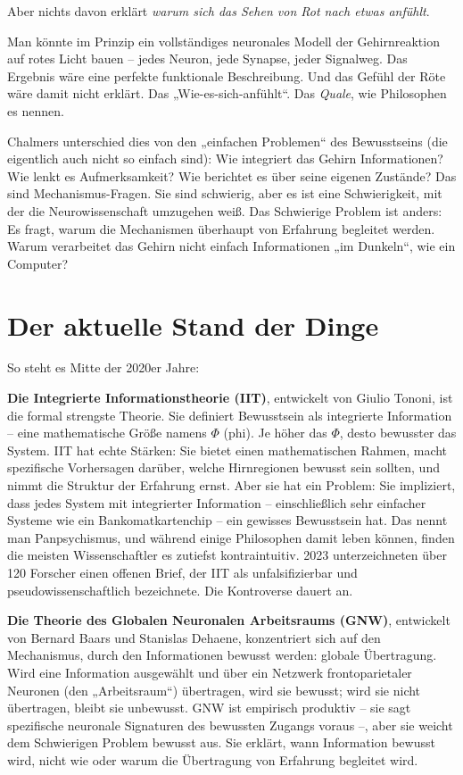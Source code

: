 \documentclass[11pt, twoside, openright]{book}
\begin{document}
Aber nichts davon erklärt \textit{warum sich das Sehen von Rot nach etwas anfühlt}.

Man könnte im Prinzip ein vollständiges neuronales Modell der Gehirnreaktion auf rotes Licht bauen -- jedes Neuron, jede Synapse, jeder Signalweg. Das Ergebnis wäre eine perfekte funktionale Beschreibung. Und das Gefühl der Röte wäre damit nicht erklärt. Das „Wie-es-sich-anfühlt“. Das \textit{Quale}, wie Philosophen es nennen.

Chalmers unterschied dies von den „einfachen Problemen“ des Bewusstseins (die eigentlich auch nicht so einfach sind): Wie integriert das Gehirn Informationen? Wie lenkt es Aufmerksamkeit? Wie berichtet es über seine eigenen Zustände? Das sind Mechanismus-Fragen. Sie sind schwierig, aber es ist eine Schwierigkeit, mit der die Neurowissenschaft umzugehen weiß. Das Schwierige Problem ist anders: Es fragt, warum die Mechanismen überhaupt von Erfahrung begleitet werden. Warum verarbeitet das Gehirn nicht einfach Informationen „im Dunkeln“, wie ein Computer?

\section*{Der aktuelle Stand der Dinge}

So steht es Mitte der 2020er Jahre:

\textbf{Die Integrierte Informationstheorie (IIT)}, entwickelt von Giulio Tononi, ist die formal strengste Theorie. Sie definiert Bewusstsein als integrierte Information -- eine mathematische Größe namens $\Phi$ (phi). Je höher das $\Phi$, desto bewusster das System. IIT hat echte Stärken: Sie bietet einen mathematischen Rahmen, macht spezifische Vorhersagen darüber, welche Hirnregionen bewusst sein sollten, und nimmt die Struktur der Erfahrung ernst. Aber sie hat ein Problem: Sie impliziert, dass jedes System mit integrierter Information -- einschließlich sehr einfacher Systeme wie ein Bankomatkartenchip -- ein gewisses Bewusstsein hat. Das nennt man Panpsychismus, und während einige Philosophen damit leben können, finden die meisten Wissenschaftler es zutiefst kontraintuitiv. 2023 unterzeichneten über 120 Forscher einen offenen Brief, der IIT als unfalsifizierbar und pseudowissenschaftlich bezeichnete. Die Kontroverse dauert an.

\textbf{Die Theorie des Globalen Neuronalen Arbeitsraums (GNW)}, entwickelt von Bernard Baars und Stanislas Dehaene, konzentriert sich auf den Mechanismus, durch den Informationen bewusst werden: globale Übertragung. Wird eine Information ausgewählt und über ein Netzwerk frontoparietaler Neuronen (den „Arbeitsraum“) übertragen, wird sie bewusst; wird sie nicht übertragen, bleibt sie unbewusst. GNW ist empirisch produktiv -- sie sagt spezifische neuronale Signaturen des bewussten Zugangs voraus --, aber sie weicht dem Schwierigen Problem bewusst aus. Sie erklärt, wann Information bewusst wird, nicht wie oder warum die Übertragung von Erfahrung begleitet wird.
\end{document}
